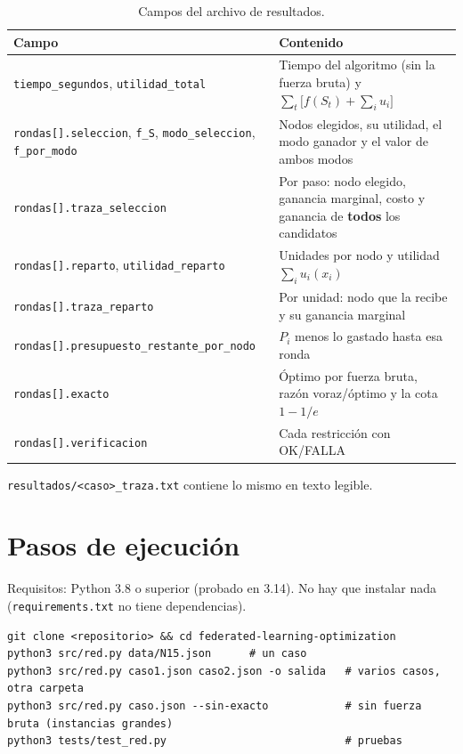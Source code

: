 \documentclass[11pt,a4paper]{article}
\begin{document}
\begin{table}[htbp]
\centering
\small
\renewcommand{\arraystretch}{1.2}
\begin{tabularx}{\textwidth}{@{}>{\raggedright\arraybackslash}p{6.2cm}>{\raggedright\arraybackslash}X@{}}
\toprule
Campo & Contenido \\
\midrule
\texttt{tiempo\_segundos}, \texttt{utilidad\_total} &
Tiempo del algoritmo (sin la fuerza bruta) y
$\sum_t\bigl[f(S_t)+\sum_i u_i\bigr]$ \\
\addlinespace
\texttt{rondas[].seleccion}, \texttt{f\_S},
\texttt{modo\_seleccion}, \texttt{f\_por\_modo} &
Nodos elegidos, su utilidad, el modo ganador y el valor de ambos modos \\
\addlinespace
\texttt{rondas[].traza\_seleccion} &
Por paso: nodo elegido, ganancia marginal, costo y ganancia de
\textbf{todos} los candidatos \\
\addlinespace
\texttt{rondas[].reparto}, \texttt{utilidad\_reparto} &
Unidades por nodo y utilidad $\sum_i u_i(x_i)$ \\
\addlinespace
\texttt{rondas[].traza\_reparto} &
Por unidad: nodo que la recibe y su ganancia marginal \\
\addlinespace
\texttt{rondas[].presupuesto\_restante\_por\_nodo} &
$P_i$ menos lo gastado hasta esa ronda \\
\addlinespace
\texttt{rondas[].exacto} &
Óptimo por fuerza bruta, razón voraz/óptimo y la cota $1-1/e$ \\
\addlinespace
\texttt{rondas[].verificacion} &
Cada restricción con OK/FALLA \\
\bottomrule
\end{tabularx}
\caption{Campos del archivo de resultados.}
\end{table}

\texttt{resultados/<caso>\_traza.txt} contiene lo mismo en texto legible.

\section{Pasos de ejecución}

Requisitos: Python 3.8 o superior (probado en 3.14). No hay que instalar nada
(\texttt{requirements.txt} no tiene dependencias).

\begin{lstlisting}
git clone <repositorio> && cd federated-learning-optimization
python3 src/red.py data/N15.json      # un caso
python3 src/red.py caso1.json caso2.json -o salida   # varios casos, otra carpeta
python3 src/red.py caso.json --sin-exacto            # sin fuerza bruta (instancias grandes)
python3 tests/test_red.py                            # pruebas
\end{lstlisting}
\end{document}
